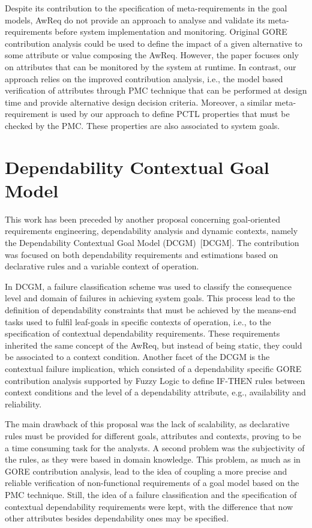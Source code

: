 Despite its contribution to the specification of meta-requirements in the goal models, AwReq do not provide an approach to analyse and validate its meta-requirements before system implementation and monitoring. Original GORE contribution analysis could be used to define the impact of a given alternative to some attribute or value composing the AwReq. However, the paper focuses only on attributes that can be monitored by the system at runtime. In contrast, our approach relies on the improved contribution analysis, i.e., the model based verification of attributes through PMC technique that can be performed at design time and provide alternative design decision criteria. Moreover, a similar meta-requirement is used by our approach to define PCTL properties that must be checked by the PMC. These properties are also associated to system goals.

\section{Dependability Contextual Goal Model}

This work has been preceded by another proposal concerning goal-oriented requirements engineering, dependability analysis and dynamic contexts, namely the Dependability Contextual Goal Model (DCGM)~[DCGM]. The contribution was focused on both dependability requirements and estimations based on declarative rules and a variable context of operation.

In DCGM, a failure classification scheme was used to classify the consequence level and domain of failures in achieving system goals. This process lead to the definition of dependability constraints that must be achieved by the means-end tasks used to fulfil leaf-goals in specific contexts of operation, i.e., to the specification of contextual dependability requirements. These requirements inherited the same concept of the AwReq, but instead of being static, they could be associated to a context condition. Another facet of the DCGM is the contextual failure implication, which consisted of a dependability specific GORE contribution analysis supported by Fuzzy Logic to define IF-THEN rules between context conditions and the level of a dependability attribute, e.g., availability and reliability.

The main drawback of this proposal was the lack of scalability, as declarative rules must be provided for different goals, attributes and contexts, proving to be a time consuming task for the analysts. A second problem was the subjectivity of the rules, as they were based in domain knowledge. This problem, as much as in GORE contribution analysis, lead to the idea of coupling a more precise and reliable verification of non-functional requirements of a goal model based on the PMC technique. Still, the idea of a failure classification and the specification of contextual dependability requirements were kept, with the difference that now other  attributes besides dependability ones may be specified.

